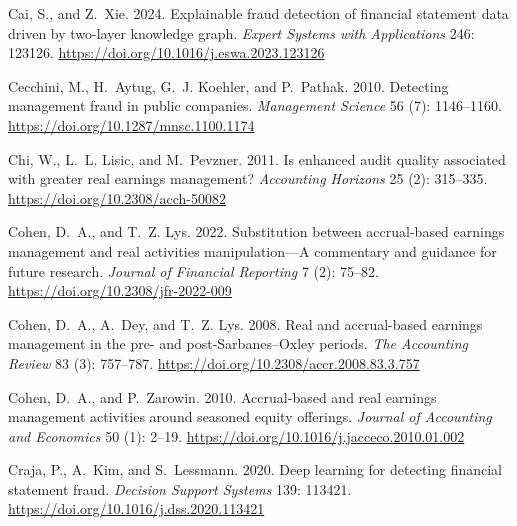 \documentclass[12pt]{article}
\begin{document}
\begin{thebibliography}{}
Cai, S., and Z.~Xie. 2024.
\newblock Explainable fraud detection of financial statement data driven by
  two-layer knowledge graph.
\newblock \textit{Expert Systems with Applications} 246: 123126.
  \url{https://doi.org/10.1016/j.eswa.2023.123126}

Cecchini, M., H.~Aytug, G.~J. Koehler, and P.~Pathak. 2010.
\newblock Detecting management fraud in public companies.
\newblock \textit{Management Science} 56 (7): 1146--1160.
  \url{https://doi.org/10.1287/mnsc.1100.1174}

Chi, W., L.~L. Lisic, and M.~Pevzner. 2011.
\newblock Is enhanced audit quality associated with greater real earnings
  management?
\newblock \textit{Accounting Horizons} 25 (2): 315--335.
  \url{https://doi.org/10.2308/acch-50082}

Cohen, D.~A., and T.~Z. Lys. 2022.
\newblock Substitution between accrual-based earnings management and real
  activities manipulation---A commentary and guidance for future research.
\newblock \textit{Journal of Financial Reporting} 7 (2): 75--82.
  \url{https://doi.org/10.2308/jfr-2022-009}

Cohen, D.~A., A.~Dey, and T.~Z. Lys. 2008.
\newblock Real and accrual-based earnings management in the pre- and
  post-Sarbanes--Oxley periods.
\newblock \textit{The Accounting Review} 83 (3): 757--787.
  \url{https://doi.org/10.2308/accr.2008.83.3.757}

Cohen, D.~A., and P.~Zarowin. 2010.
\newblock Accrual-based and real earnings management activities around seasoned
  equity offerings.
\newblock \textit{Journal of Accounting and Economics} 50 (1): 2--19.
  \url{https://doi.org/10.1016/j.jacceco.2010.01.002}

Craja, P., A.~Kim, and S.~Lessmann. 2020.
\newblock Deep learning for detecting financial statement fraud.
\newblock \textit{Decision Support Systems} 139: 113421.
  \url{https://doi.org/10.1016/j.dss.2020.113421}


\end{thebibliography}
\end{document}

